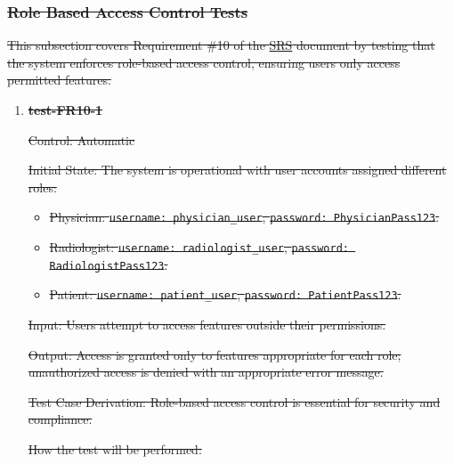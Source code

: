 \documentclass[12pt, titlepage]{article}
\begin{document}
\subsubsection{\texorpdfstring{\sout{Role Based Access Control Tests}}{Role Based Access Control Tests}}

\sout{This subsection covers Requirement \#10 of the \href{https://github.com/RezaJodeiri/CXR-Capstone/blob/main/docs/SRS/SRS.pdf}{SRS}
document by testing that the system enforces role-based access control, ensuring users only access permitted features.} \citep{SRS}

\begin{enumerate}
\item \textbf{\sout{test-FR10-1}} \label{test-FR10-1}

\sout{Control: Automatic}

\sout{Initial State: The system is operational with user accounts assigned different roles:}
\begin{itemize}
  \item \sout{Physician: \texttt{username: physician\_user}, \texttt{password: PhysicianPass123}.}
  \item \sout{Radiologist: \texttt{username: radiologist\_user}, \texttt{password: RadiologistPass123}.}
  \item \sout{Patient: \texttt{username: patient\_user}, \texttt{password: PatientPass123}.}
\end{itemize}

\sout{Input: Users attempt to access features outside their permissions.}

\sout{Output: Access is granted only to features appropriate for each role; unauthorized access is denied with an appropriate error message.}

\sout{Test Case Derivation: Role-based access control is essential for security and compliance.}

\sout{How the test will be performed:}


\end{enumerate}
\end{document}
